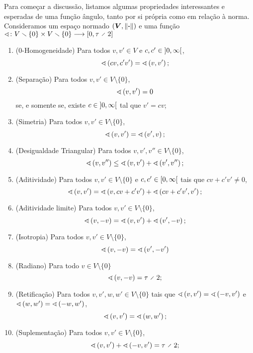 Para começar a discussão, listamos algumas propriedades interessantes e esperadas de uma função ângulo, tanto por si própria como em relação à norma. Consideramos um espaço normado $(\bm V, \left\Vert{\bm{\cdot}}\right\Vert)$ e uma função $\fun{\angf}{V \setminus \{0\} \times V \setminus \{0\}}{\intff{0}{\tau \div 2}}$
	\begin{enumerate}
		\item ($0$-Homogeneidade) Para todos $v,v' \in V$ e $c,c' \in \left]{0},{\infty}\right[$,
			\begin{equation*}
				\sphericalangle\left({cv},{c'v'}\right) = \sphericalangle\left({v},{v'}\right);
			\end{equation*}
		\item (Separação) Para todos $v,v' \in V \setminus \{0\}$,
			\begin{equation*}
				\sphericalangle\left({v},{v'}\right) = 0
			\end{equation*}
		se, e somente se, existe $c \in \left]{0},{\infty}\right[$ tal que $v'=cv$;
		\item (Simetria) Para todos $v,v' \in V \setminus \{0\}$,
			\begin{equation*}
				\sphericalangle\left({v},{v'}\right) = \sphericalangle\left({v'},{v}\right);
			\end{equation*}
		\item (Desigualdade Triangular) Para todos $v,v',v'' \in V \setminus \{0\}$,
			\begin{equation*}
				\sphericalangle\left({v},{v''}\right) \leq \sphericalangle\left({v},{v'}\right) + \sphericalangle\left({v'},{v''}\right);
			\end{equation*}
		
		\item (Aditividade) Para todos $v,v' \in V \setminus \{0\}$ e $c,c' \in \left[{0},{\infty}\right[$ tais que $cv+c'v' \neq 0$,
			\begin{equation*}
				\sphericalangle\left({v},{v'}\right) = \sphericalangle\left({v},{cv+c'v'}\right) + \sphericalangle\left({cv+c'v'},{v'}\right);
			\end{equation*}
		\item (Aditividade limite) Para todos $v,v' \in V \setminus \{0\}$,
		\begin{equation*}
			\sphericalangle\left({v},{-v}\right) = \sphericalangle\left({v},{v'}\right) + \sphericalangle\left({v'},{-v}\right);
		\end{equation*}
		
		\item (Isotropia) Para todos $v,v' \in V \setminus \{0\}$,
			\begin{equation*}
				\sphericalangle\left({v},{-v}\right) = \sphericalangle\left({v'},{-v'}\right)
			\end{equation*}
		\item (Radiano) Para todo $v \in V \setminus \{0\}$ 
			\begin{equation*}
				\ang{v}{-v} = \tau \div 2;
			\end{equation*}
		\item (Retificação) Para todos $v,v',w,w' \in V \setminus \{0\}$ tais que $\sphericalangle\left({v},{v'}\right) = \sphericalangle\left({-v},{v'}\right)$ e $\sphericalangle\left({w},{w'}\right) = \sphericalangle\left({-w},{w'}\right)$,
			\begin{equation*}
				\sphericalangle\left({v},{v'}\right) = \sphericalangle\left({w},{w'}\right);
			\end{equation*}
		\item (Suplementação) Para todos $v,v' \in V \setminus \{0\}$,
			\begin{equation*}
				\ang{v}{v'} + \ang{-v}{v'} = \tau \div 2;
			\end{equation*}
		

\end{enumerate}
